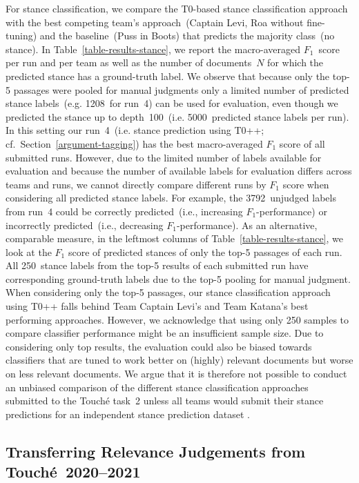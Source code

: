 
For stance classification, we compare the T0-based stance classification approach with the best competing team's approach~(Captain Levi, Ro\Bert{}a without fine-tuning) and the baseline~(Puss in Boots) that predicts the majority class~(no stance). In Table~\ref{table-results-stance}, we report the macro-averaged $F_1$~score per run and per team as well as the number of documents~$N$ for which the predicted stance has a ground-truth label. We observe that because only the top-5 passages were pooled for manual judgments only a limited number of predicted stance labels~(e.g. 1208~for run~4) can be used for evaluation, even though we predicted the stance up to depth~100~(i.e. 5000~predicted stance labels per run). In this setting our run~4~(i.e. stance prediction using T0++; cf.\ Section~\ref{argument-tagging}) has the best macro-averaged $F_1$ score of all submitted runs. However, due to the limited number of labels available for evaluation and because the number of available labels for evaluation differs across teams and runs, we cannot directly compare different runs by $F_1$ score when considering all predicted stance labels. For example, the 3792~unjudged labels from run~4 could be correctly predicted~(i.e., increasing $F_1$-performance) or incorrectly predicted~(i.e., decreasing $F_1$-performance). As an alternative, comparable measure, in the leftmost columns of Table~\ref{table-results-stance}, we look at the $F_1$ score of predicted stances of only the top-5 passages of each run. All 250~stance labels from the top-5 results of each submitted run have corresponding ground-truth labels due to the top-5 pooling for manual judgment.
When considering only the top-5 passages, our stance classification approach using T0++ falls behind Team Captain Levi's and Team Katana's best performing approaches.
However, we acknowledge that using only 250 samples to compare classifier performance might be an insufficient sample size. Due to considering only top results, the evaluation could also be biased towards classifiers that are tuned to work better on (highly) relevant documents but worse on less relevant documents. We argue that it is therefore not possible to conduct an unbiased comparison of the different stance classification approaches submitted to the Touché task~2 unless all teams would submit their stance predictions for an independent stance prediction dataset .


\subsection{Transferring Relevance Judgements from Touché~2020--2021}
\label{transfer-relevance-judgements}

